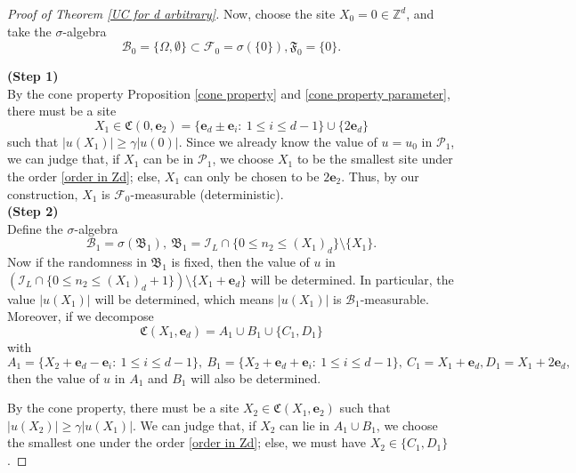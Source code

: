 \documentclass[11pt,reqno,UTF8,twoside]{amsart}
\newcommand{\Z}{\mathbb{Z}}
\newcommand{\bfe}{\mathbf{e}}
\newcommand{\mcB}{\mathcal{B}}
\newcommand{\mcF}{\mathcal{F}}
\newcommand{\mcP}{\mathcal{P}}
\newcommand{\mcI}{\mathcal{I}}
\theoremstyle{definition}
\numberwithin{equation}{section}
\begin{document}
\begin{proof}[Proof of Theorem \ref{UC for d arbitrary}]
Now, choose the site $X_0=0\in \Z^d$, and take the $\sigma$-algebra
\[\mcB_0=\{\Omega,\emptyset\}\subset \mcF_0=\sigma (\{0\}), \mathfrak{F}_0=\{0\} . \]


\noindent \textbf{{(Step 1)}}\\

\noindent By the cone property Proposition \ref{cone property} and \eqref{cone property parameter}, there must be a site 
\[X_1\in  \mathfrak{C}(0,\bfe_2)=\{ \bfe_d\pm \bfe_i: \ 1\leq i\leq d-1 \}\cup\{ 2\bfe_d\}\]
such that $|u(X_1)|\geq \gamma |u(0)|$. Since we already know the value of $u=u_0$ in $\mcP_1$, we can judge that,  if $X_1$ can be in $\mcP_1$, we choose $X_1$ to be the smallest site under the order \eqref{order in Zd}; else, $X_1$ can only be chosen to be $2\bfe_2$. Thus, by our construction, {$X_1$ is $\mcF_0$-measurable} (deterministic).\\







\noindent \textbf{{(Step 2)}}\\

\noindent Define the $\sigma$-algebra 
\begin{equation}\label{mcB 1, d arbitrary}
  \mcB_1=\sigma\left( \mathfrak{B}_1 \right), \ \mathfrak{B}_1 =\mcI_L\cap \{0\leq n_2\leq (X_1)_d\} \setminus \{X_1\} .
\end{equation}
Now if the randomness in $\mathfrak{B}_1$ is fixed, then the value of $u$ in $(\mcI_L\cap \{0\leq n_2\leq (X_1)_d+1\}) \setminus \{X_1+\bfe_d\}$ will be determined. In particular, the value $|u(X_1)|$ will be determined, which means {$|u(X_1)|$ is $\mcB_1$-measurable}. Moreover, if we decompose 
\[\mathfrak{C}(X_1,\bfe_d)=A_1\cup B_1\cup\{C_1,D_1\}\]
with 
\[A_1=\{X_2+\bfe_d-\bfe_i :\ 1\leq i\leq d-1\}, \ B_1 = \{X_2+\bfe_d+\bfe_i :\ 1\leq i\leq d-1\},\ C_1=X_1+\bfe_d,D_1=X_1+2\bfe_d,\]
then the value of $u$ in $A_1$ and $B_1$ will also be determined.

By the cone property, there must be a site $X_2 \in  \mathfrak{C}(X_1,\bfe_2)$ such that $|u(X_2)|\geq \gamma |u(X_1)|$. We can judge that,  if $X_2$ can lie in $A_1\cup B_1$, we choose the smallest one under the order \eqref{order in Zd}; else,
we must have $X_2\in \{C_1,D_1\}$. 



\end{proof}
\end{document}
